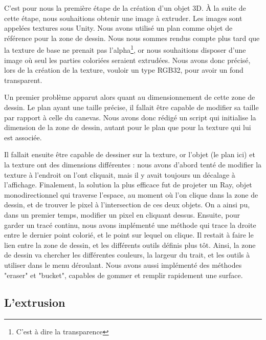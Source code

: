 \documentclass[a4paper,11pt]{article}
\begin{document}
			C'est pour nous la première étape de la création d'un objet 3D. À la suite de cette étape, nous souhaitions obtenir une image à extruder. Les images sont appelées textures sous Unity. Nous avons utilisé un plan comme objet de référence pour la zone de dessin. Nous nous sommes rendus compte plus tard que la texture de base ne prenait pas l'alpha\footnote{C'est à dire la transparence}, or nous souhaitions disposer d'une image où seul les parties coloriées seraient extrudées. Nous avons donc précisé, lors de la création de la texture, vouloir un type RGB32, pour avoir un fond transparent.
			
			Un premier problème apparut alors quant au dimensionnement de cette zone de dessin. Le plan ayant une taille précise, il fallait être capable de modifier sa taille par rapport à celle du canevas. Nous avons donc rédigé un script qui initialise la dimension de la zone de dessin, autant pour le plan que pour la texture qui lui est associée.
			
			Il fallait ensuite être capable de dessiner sur la texture, or l'objet (le plan ici) et la texture ont des dimensions différentes : nous avons d'abord tenté de modifier la texture à l'endroit on l'ont cliquait, mais il y avait toujours un décalage à l'affichage. Finalement, la solution la plus efficace fut de projeter un Ray, objet monodirectionnel qui traverse l'espace, au moment où l'on clique dans la zone de dessin, et de trouver le pixel à l'intersection de ces deux objets. On a ainsi pu, dans un premier temps, modifier un pixel en cliquant dessus. Ensuite, pour garder un tracé continu, nous avons implémenté une méthode qui trace la droite entre le dernier point colorié, et le point sur lequel on clique. Il restait à faire le lien entre la zone de dessin, et les différents outils définis plus tôt. Ainsi, la zone de dessin va chercher les différentes couleurs, la largeur du trait, et les outils à utiliser dans le menu déroulant. Nous avons aussi implémenté des méthodes "eraser" et "bucket", capables de gommer et remplir rapidement une surface.
		\subsection{L'extrusion}
		
\end{document}

